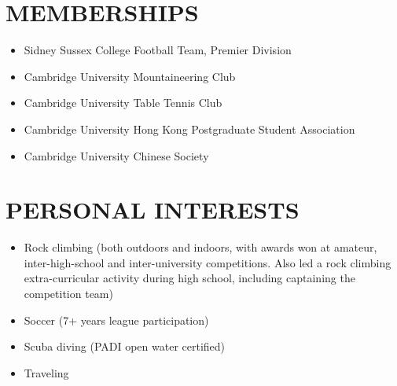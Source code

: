 \documentclass[a4paper,10pt]{extarticle}
\begin{document}
\section*{MEMBERSHIPS}
\begin{itemize}
    \item Sidney Sussex College Football Team, Premier Division

    \item Cambridge University Mountaineering Club

    \item Cambridge University Table Tennis Club

    \item Cambridge University Hong Kong Postgraduate Student Association

    \item Cambridge University Chinese Society
\end{itemize}

\section*{PERSONAL INTERESTS}
\begin{itemize}
    \item Rock climbing (both outdoors and indoors, with awards won at amateur, inter-high-school and inter-university competitions. Also led a rock climbing extra-curricular activity during high school, including captaining the competition team)

    \item Soccer (7+ years league participation)

    \item Scuba diving (PADI open water certified)

    \item Traveling
\end{itemize}







\end{document}
